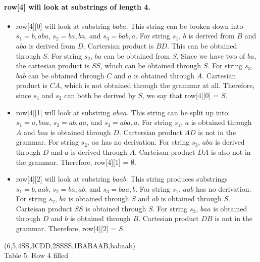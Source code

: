 \documentclass[12pt]{article}
\begin{document}
\paragraph{row[4] will look at substrings of length 4.}
\begin{itemize}
    \item row[4][0] will look at substring $baba$. This string can be broken down into $s_1 = b, aba$, $s_2 = ba, ba$, and $s_3 = bab, a$. For string $s_1$, $b$ is derived from $B$ and $aba$ is derived from $D$. Cartersian product is $BD$. This can be obtained through $S$. For string $s_2$, $ba$ can be obtained from $S$. Since we have two of $ba$, the cartesian product is $SS$, which can be obtained through $S$. For string $s_3$, $bab$ can be obtained through $C$ and $a$ is obtained through $A$. Cartesian product is $CA$, which is not obtained through the grammar at all. Therefore, since $s_1$ and $s_2$ can both be derived by $S$, we say that row[4][0] = $S$. 
    \item row[4][1] will look at substring $abaa$. This string can be split up into: $s_1 = a, baa$, $s_2 = ab, aa$, and $s_3 = aba,a$. For string $s_1$, $a$ is obtained through $A$ and $baa$ is obtained through $D$. Cartersian product $AD$ is not in the grammar. For string $s_2$, $aa$ has no derivation. For string $s_3$, $aba$ is derived through $D$ and $a$ is derived through $A$. Carteisan product $DA$ is also not in the grammar. Therefore, row[4][1] = $\emptyset$.
    \item row[4][2] will look at substring $baab$. This string produces substrings $s_1 = b, aab$, $s_2 = ba, ab$, and $s_3 = baa, b$. For string $s_1$, $aab$ has no derivation. For string $s_2$, $ba$ is obtained through $S$ and $ab$ is obtained through $S$. Carteisan product $SS$ is obtained through $S$. For string $s_3$, $baa$ is obtained through $D$ and $b$ is obtained through $B$. Cartesian product $DB$ is not in the grammar. Therefore, row[4][2] = $S$.
\end{itemize}

\begin{center}
    \young(6\hfill,5\hfill \hfill,4S\emptyset S,3CDD\emptyset,2SSS\emptyset S,1BABAAB,\hfill babaab) \\
    Table 5: Row 4 filled
\end{center}
\end{document}
